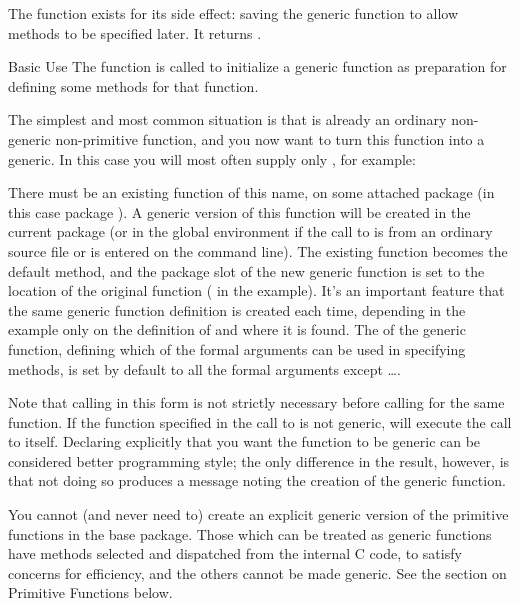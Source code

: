 %
\begin{Value}
The  function exists for its side effect: saving the
generic function to allow methods to be specified later.  It returns
.
\end{Value}
%
\begin{Section}{Basic Use}
The  function is called to initialize a generic
function as
preparation for defining some methods for that function.

The simplest and most common situation is that  is already
an ordinary non-generic non-primitive function, and you now want to turn this
function into a generic.  In this case you will most often supply only
, for example:


There must be an existing function of this name, on some  attached package (in this case package ).
A generic version of this function will be created in the current package (or in the global environment if the call to  is from an ordinary source file or is entered on the command line).
The existing function becomes the default method, and
the package slot of the new generic function is set to the location of the original function ( in the example).  It's an important feature that the same generic function definition is created each time, depending in the example only on the definition of  and where it is found.
The  of the generic function, defining which of the formal arguments can be used in specifying methods, is set by default to all the formal arguments except \dots.

Note that calling  in this form is not strictly necessary before calling  for the same function.  If the function specified in the call to  is not generic,  will execute the call to  itself.  Declaring explicitly that you want the function to be generic can be considered better programming style; the only difference in the result, however, is that not doing so produces a message noting the creation of the generic function.

You cannot (and never need to) create an explicit generic version of the
primitive functions in the base package.  Those which can be treated
as generic functions have methods selected and
dispatched from the internal C code, to satisfy concerns for  efficiency, and the others cannot be made
generic.  See the section on Primitive Functions below.


\end{Section}
